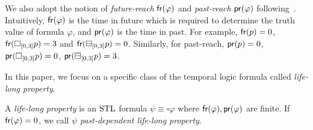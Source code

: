 We also adopt the notion of \emph{future-reach} $\operatorname{\mathsf{fr}}(\varphi)$ and
\emph{past-reach} $\operatorname{\mathsf{pr}}(\varphi)$ following~\cite{DBLP:conf/rv/HoOW14}.
Intuitively, $\operatorname{\mathsf{fr}}(\varphi)$ is the time in future which is required to determine the truth value of formula $\varphi$, and $\operatorname{\mathsf{pr}}(\varphi)$ is the time in past.
For example,
$\operatorname{\mathsf{fr}}(p) = 0$, $\operatorname{\mathsf{fr}}(\square_{[0, 3]}p) = 3$ and $\operatorname{\mathsf{fr}}(\boxminus_{[0,3]}p) = 0$.
Similarly, for past-reach,
$\operatorname{\mathsf{pr}}(p) = 0$, $\operatorname{\mathsf{pr}}(\square_{[0, 3]}p) = 0$, $\operatorname{\mathsf{pr}}(\boxminus_{[0,3]}p) = 3$.



In this paper, we focus on a specific class of the temporal logic formula called \emph{life-long property}.

\begin{definition}
  A \emph{life-long property} is an $\mathrm{STL}$ formula $\psi \equiv \square \varphi$ where $\operatorname{\mathsf{fr}}(\varphi),
  \operatorname{\mathsf{pr}}(\varphi)$ are finite.
  If $\operatorname{\mathsf{fr}}(\varphi) = 0$, we call $\psi$ \emph{past-dependent life-long property}.

\end{definition}



